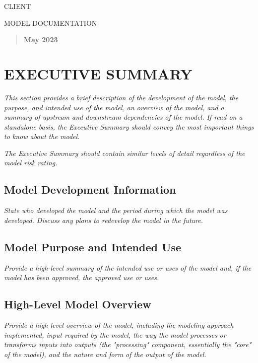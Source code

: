 \documentclass[12pt,letterpaper]{article}
\newcommand{\smallcapsstyle}[1]{\textsc{\MakeUppercase{#1}}}
\begin{document}
{\centering
\smallcapsstyle{CLIENT}

\vspace{0.5cm}

\smallcapsstyle{Model Documentation}

\vspace{0.5cm}

\begin{quote}
\textbf{May 2023}
\end{quote}
\par}

\tableofcontents
\clearpage

\section{EXECUTIVE SUMMARY}
\textit{This section provides a brief description of the development of the model, the purpose, and intended use of the model, an overview of the model, and a summary of upstream and downstream dependencies of the model. If read on a standalone basis, the Executive Summary should convey the most important things to know about the model.}

\textit{The Executive Summary should contain similar levels of detail regardless of the model risk rating.}

\subsection{Model Development Information}
\textit{State who developed the model and the period during which the model was developed. Discuss any plans to redevelop the model in the future.}

\subsection{Model Purpose and Intended Use}
\textit{Provide a high-level summary of the intended use or uses of the model and, if the model has been approved, the approved use or uses.}

\subsection{High-Level Model Overview}
\textit{Provide a high-level overview of the model, including the modeling approach implemented, input required by the model, the way the model processes or transforms inputs into outputs (the "processing" component, essentially the "core" of the model), and the nature and form of the output of the model.}
\end{document}
